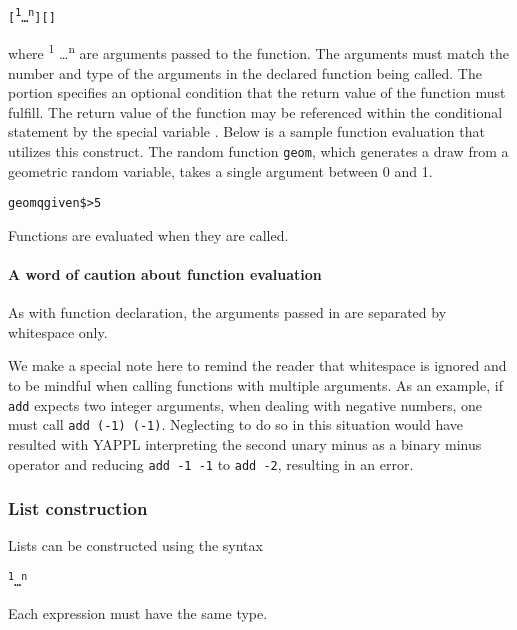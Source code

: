 \begin{alltt}
\quad \term{\midtilde}  [ \textsuperscript{1} \dots {}\textsuperscript{n} ] [   ] 
\end{alltt}

where  \textsuperscript{1} \dots {}\textsuperscript{n} are arguments passed to the function. The arguments must match the number and type of the arguments in the declared function being called. The   portion specifies an optional condition that the return value of the function must fulfill. The return value of the function may be referenced within the conditional statement by the special variable \term{\$}. Below is a sample function evaluation that utilizes this construct. The random function \texttt{geom}, which generates a draw from a geometric random variable, takes a single argument between 0 and 1.

\begin{alltt}
\quad \midtilde geom q given \$ > 5
\end{alltt}

Functions are evaluated when they are called. 

\paragraph{A word of caution about function evaluation}

As with function declaration, the arguments passed in are separated by whitespace only.

We make a special note here to remind the reader that whitespace is ignored and to be mindful when calling functions with multiple arguments. As an example, if \texttt{add} expects two integer arguments, when dealing with negative numbers, one must call \texttt{\midtilde add (-1) (-1)}. Neglecting to do so in this situation would have resulted with YAPPL interpreting the second unary minus as a binary minus operator and reducing \texttt{\midtilde add -1 -1} to \texttt{\midtilde add -2}, resulting in an error.

\subsubsection{List construction}

Lists can be constructed using the syntax
\begin{alltt}
\quad \term{[} \textsuperscript{1} \term{,} \dots \term{,} \textsuperscript{n}  \term{]}
\end{alltt}
Each expression must have the same type. 

